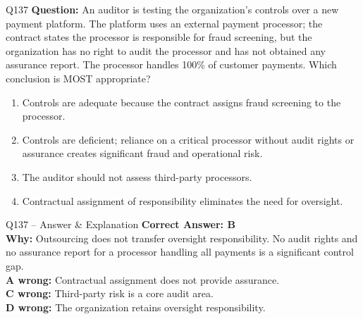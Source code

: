 \documentclass[aspectratio=169,10pt]{beamer}
\begin{document}
	\begin{frame}[t]{Q137}
		\small
		\textbf{Question:} An auditor is testing the organization's controls over a new payment platform. The platform uses an external payment processor; the contract states the processor is responsible for fraud screening, but the organization has no right to audit the processor and has not obtained any assurance report. The processor handles 100\% of customer payments. Which conclusion is MOST appropriate?
		\begin{enumerate}[label=\Alph*.,itemsep=1pt,topsep=2pt]
			\item Controls are adequate because the contract assigns fraud screening to the processor.
			\item Controls are deficient; reliance on a critical processor without audit rights or assurance creates significant fraud and operational risk.
			\item The auditor should not assess third-party processors.
			\item Contractual assignment of responsibility eliminates the need for oversight.
		\end{enumerate}
	\end{frame}
	
	\begin{frame}[t]{Q137 -- Answer \& Explanation}
		\small
		\textbf{Correct Answer: B} \\[4pt]
		\textbf{Why:} Outsourcing does not transfer oversight responsibility. No audit rights and no assurance report for a processor handling all payments is a significant control gap. \\[4pt]
		\textbf{A wrong:} Contractual assignment does not provide assurance. \\[2pt]
		\textbf{C wrong:} Third-party risk is a core audit area. \\[2pt]
		\textbf{D wrong:} The organization retains oversight responsibility.
	\end{frame}
	
\end{document}
